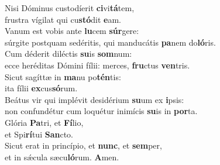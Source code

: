 \evenverse Nisi Dóminus custodíerit \textbf{ci}vi\textbf{tá}tem,~\*\\
\evenverse frustra vígilat qui cu\textbf{stó}dit \textbf{e}am.\\
\oddverse Vanum est vobis ante \textbf{lu}cem \textbf{súr}gere:~\*\\
\oddverse súrgite postquam sedéritis, qui manducátis \textbf{pa}nem do\textbf{ló}ris.\\
\evenverse Cum déderit diléctis \textbf{su}is \textbf{som}num:~\*\\
\evenverse ecce heréditas Dómini fílii: merces, \textbf{fru}ctus \textbf{ven}tris.\\
\oddverse Sicut sagíttæ in \textbf{ma}nu po\textbf{tén}tis:~\*\\
\oddverse ita fílii \textbf{ex}cus\textbf{só}rum.\\
\evenverse Beátus vir qui implévit desidérium \textbf{su}um ex \textbf{i}psis:~\*\\
\evenverse non confundétur cum loquétur inimícis \textbf{su}is in \textbf{por}ta.\\
\oddverse Glória \textbf{Pa}tri, et \textbf{Fí}lio,~\*\\
\oddverse et Spi\textbf{rí}tui \textbf{San}cto.\\
\evenverse Sicut erat in princípio, et \textbf{nunc}, et \textbf{sem}per,~\*\\
\evenverse et in sǽcula sæcu\textbf{ló}rum. \textbf{A}men.\\
